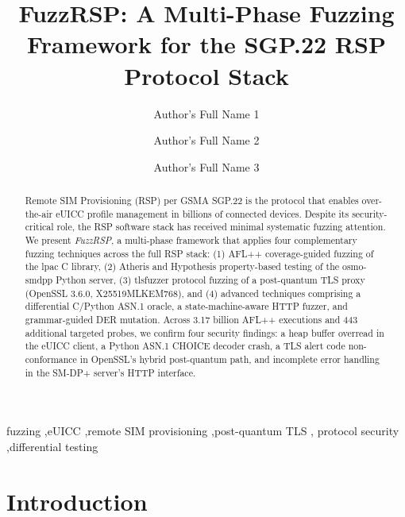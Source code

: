\documentclass[final,3p,times,twocolumn]{elsarticle}
\begin{document}
\begin{frontmatter}

\title{FuzzRSP: A Multi-Phase Fuzzing Framework for the SGP.22 RSP Protocol Stack}

\author{Author's Full Name 1}

\author{Author's Full Name 2}

\author{Author's Full Name 3}

\address{Department of Computer Science and Engineering, Institution, City, Country}


\begin{abstract}
Remote SIM Provisioning (RSP) per GSMA SGP.22 is the protocol that enables
over-the-air eUICC profile management in billions of connected devices.
Despite its security-critical role, the RSP software stack has received
minimal systematic fuzzing attention.
We present \textit{FuzzRSP}, a multi-phase framework that applies four
complementary fuzzing techniques across the full RSP stack:
(1) AFL++ coverage-guided fuzzing of the lpac C library,
(2) Atheris and Hypothesis property-based testing of the osmo-smdpp Python server,
(3) tlsfuzzer protocol fuzzing of a post-quantum TLS proxy (OpenSSL 3.6.0,
X25519MLKEM768), and
(4) advanced techniques comprising a differential C/Python ASN.1 oracle,
a state-machine-aware HTTP fuzzer, and grammar-guided DER mutation.
Across 3.17 billion AFL++ executions and 443 additional targeted probes, we
confirm four security findings: a heap buffer overread in the eUICC client,
a Python ASN.1 CHOICE decoder crash, a TLS alert code non-conformance in
OpenSSL's hybrid post-quantum path, and incomplete error handling in the
SM-DP+ server's HTTP interface.
\end{abstract}

\begin{keyword}
fuzzing \sep eUICC \sep remote SIM provisioning \sep post-quantum TLS \sep
protocol security \sep differential testing
\end{keyword}

\end{frontmatter}

\section{Introduction}\label{sec:intro}
\end{document}
